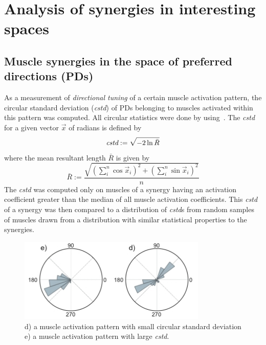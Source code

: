 





\section{Analysis of synergies in interesting spaces} %
\label{sg:sec:syn_comp}


\subsection{Muscle synergies in the space of preferred directions (PDs)} %
\label{sg:sub:pd}

As a measurement of \emph{directional tuning} of a certain muscle activation pattern, the circular standard deviation (\emph{cstd}) of PDs belonging to muscles activated within this pattern was computed. All circular statistics were done by using~\citet{Velasco:2009p5150}. The \emph{cstd} for a given vector $\vec{x}$ of radians is defined by 
\begin{equation}
	\emph{cstd} := \sqrt{-2 \ln{\bar{R}}}
\end{equation}
where the mean resultant length $\bar{R}$ is given by 
\begin{equation}
	\bar{R} := \frac
					{ \sqrt{ {(\sum_{i}^n \cos  \vec{x}_i)}^2 + {(\sum_{i}^n \sin \vec{x}_i)}^2 }}
					{n}
\end{equation}
The \emph{cstd} was computed only on muscles of a synergy having an activation coefficient greater than the median of all muscle activation coefficients. This \emph{cstd} of a synergy was then compared
to a distribution of \emph{cstd}s from random samples of muscles drawn from a distribution with similar statistical properties to the synergies.


\begin{figure}[ht]
	\centering
		\includegraphics[width=0.8\textwidth]{images/cstd.jpg}
	\caption
	{
	d) a muscle activation pattern with small circular standard deviation \\
	e) a muscle activation pattern with large \emph{cstd}.
	}
	\label{sg:fig:images_cstd}
\end{figure}


